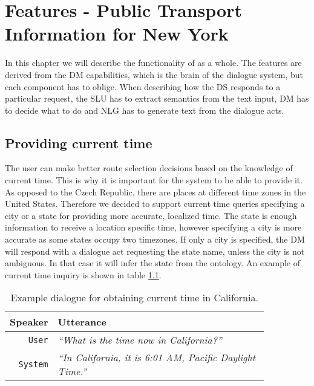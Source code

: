 \chapter{Features - Public Transport Information for New York}

In this chapter we will describe the functionality of  as a whole.
The features are derived from the DM capabilities, which is the brain of the dialogue system, but each component has to oblige.
When describing how the DS responds to a particular request, the SLU has to extract semantics from the text input, DM has to decide what to do and NLG has to generate text from the dialogue acts.

\section{Providing current time} \label{sec:time}

The user can make better route selection decisions based on the knowledge of current time.
This is why it is important for the system to be able to provide it.
As opposed to the Czech Republic, there are places at different time zones in the United States.
Therefore we decided to support current time queries specifying a city or a state for providing more accurate, localized time.
The state is enough information to receive a location specific time, however specifying a city is more accurate as some states occupy two timezones.
If only a city is specified, the DM will respond with a dialogue act requesting the state name, unless the city is not ambiguous.
In that case it will infer the state from the ontology.
An example of current time inquiry is shown in table \ref{table:time}.


\begin{table}[h]
\centering
\begin{tabular}{ | r | p{0.85\linewidth} | } \hline
	\textbf{Speaker} & \textbf{Utterance} \\ \hline
	\texttt{User} & \textit{``What is the time now in California?''} \\ \hline
	\texttt{System} & \textit{``In California, it is 6:01 AM, Pacific Daylight Time.''} \\ \hline
\end{tabular}
\caption[Current time in California]{Example dialogue for obtaining current time in California.}
\label{table:time}
\end{table}

